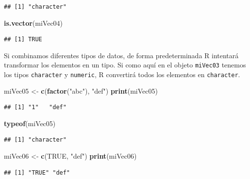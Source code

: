 \documentclass[]{book}
\newenvironment{Shaded}{\begin{snugshade}}{\end{snugshade}}
\newcommand{\KeywordTok}[1]{\textcolor[rgb]{0.13,0.29,0.53}{\textbf{#1}}}
\newcommand{\StringTok}[1]{\textcolor[rgb]{0.31,0.60,0.02}{#1}}
\newcommand{\OtherTok}[1]{\textcolor[rgb]{0.56,0.35,0.01}{#1}}
\newcommand{\NormalTok}[1]{#1}
\begin{document}
\begin{verbatim}
## [1] "character"
\end{verbatim}

\begin{Shaded}
\begin{Highlighting}[]
\KeywordTok{is.vector}\NormalTok{(miVec04)}
\end{Highlighting}
\end{Shaded}

\begin{verbatim}
## [1] TRUE
\end{verbatim}

Si combinamos diferentes tipos de datos, de forma predeterminada R
intentará transformar los elementos en un tipo. Si como aquí en el
objeto \texttt{miVec03} tenemos los tipos \texttt{character} y
\texttt{numeric}, R convertirá todos los elementos en
\texttt{character}.

\begin{Shaded}
\begin{Highlighting}[]
\NormalTok{miVec05 <-}\StringTok{ }\KeywordTok{c}\NormalTok{(}\KeywordTok{factor}\NormalTok{(}\StringTok{"abc"}\NormalTok{), }\StringTok{"def"}\NormalTok{)}
\KeywordTok{print}\NormalTok{(miVec05)}
\end{Highlighting}
\end{Shaded}

\begin{verbatim}
## [1] "1"   "def"
\end{verbatim}

\begin{Shaded}
\begin{Highlighting}[]
\KeywordTok{typeof}\NormalTok{(miVec05)}
\end{Highlighting}
\end{Shaded}

\begin{verbatim}
## [1] "character"
\end{verbatim}

\begin{Shaded}
\begin{Highlighting}[]
\NormalTok{miVec06 <-}\StringTok{ }\KeywordTok{c}\NormalTok{(}\OtherTok{TRUE}\NormalTok{, }\StringTok{"def"}\NormalTok{)}
\KeywordTok{print}\NormalTok{(miVec06)}
\end{Highlighting}
\end{Shaded}

\begin{verbatim}
## [1] "TRUE" "def"
\end{verbatim}
\end{document}
